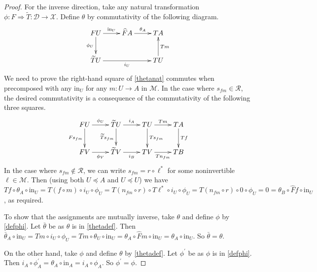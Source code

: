 \documentclass[a4paper,12pt,reqno]{amsart}
\theoremstyle{definition}
\theoremstyle{fact}
\theoremstyle{genquest}
\theoremstyle{step}
\newcommand{\dd}{\colon}
\newcommand{\ra}{\rightarrow}
\def\CD{{\mathscr D}}
\def\CM{{\mathscr M}}
\def\CR{{\mathscr R}}
\def\CX{{\mathscr X}}
\begin{document}
\begin{proof}
For the inverse direction, take any natural transformation $\phi \dd F\Rightarrow \widetilde{T} \dd \CD\ra \CX$.
Define $\theta$ by commutativity of the following diagram.
\begin{equation}\label{thetadef}
\begin{aligned}
\xymatrix{
FU \ar[r]^-{\mathrm{in}_U} \ar[d]_-{\phi_U} & \widehat{F}A  \ar[r]^-{\theta_A} & TA \\
\widetilde{T}U \ar[rr]_-{i_U} &  & TU \ar[u]_-{Tm}}
\end{aligned}
\end{equation}       
We need to prove the right-hand square of \eqref{thetanat} commutes when precomposed
with any $\mathrm{in}_U$ for any $m:U\ra A$ in $\CM$.  
In the case where $s_{fm}\in \CR$, the desired commutativity is a consequence of the commutativity of the following three squares.
\begin{equation}\label{pfthetanat}
\begin{aligned}
\xymatrix{
FU \ar[r]^-{\phi_U} \ar[d]_-{Fs_{fm}} & \widetilde{T}U \ar[d]_-{\widetilde{T}s_{fm}} \ar[r]^-{i_A} & TU \ar[r]^-{Tm} \ar[d]^-{Ts_{fm}} & TA \ar[d]^-{Tf}\\
FV \ar[r]_-{\phi_V} & \widetilde{T}V  \ar[r]_-{i_B} & TV \ar[r]_-{Tn_{fm}} & TB}
\end{aligned}
\end{equation}
In the case where $s_{fm}\notin \CR$, we can write $s_{fm} = r\circ \ell^*$ for some noninvertible $\ell \in \CM$.
Then (using both $U\preceq A$ and $U\preceq U$) we have $Tf \circ \theta_A \circ \mathrm{in}_U = T(f\circ m)\circ i_U \circ \phi_U =T(n_{fm}\circ r) \circ T\ell^*\circ i_U \circ \phi_U = T(n_{fm}\circ r) \circ 0 \circ \phi_U = 0 = \theta_B \circ \widehat{F}f \circ \mathrm{in}_U$, as required.

To show that the assignments are mutually inverse, take $\theta$ and define $\phi$ by \eqref{defphi}. 
Let $\bar{\theta}$ be as $\theta$ is in \eqref{thetadef}. Then $\bar{\theta}_A\circ \mathrm{in}_U = Tm \circ i_U\circ \phi_U = Tm \circ \theta_U \circ \mathrm{in}_{U} = \theta_A \circ \widehat{F}m\circ \mathrm{in}_{U} = \theta_A \circ \mathrm{in}_U$. So $\bar{\theta} = \theta$. 

On the other hand, take $\phi$ and define $\theta$ by \eqref{thetadef}. 
Let $\phi^{\prime}$ be as $\phi$ is in \eqref{defphi}. 
Then $i_A \circ \phi^{\prime}_A = \theta_A \circ \mathrm{in}_{A} = i_A\circ \phi_A$. 
So $\phi^{\prime} = \phi$.    
\end{proof}
\end{document}
